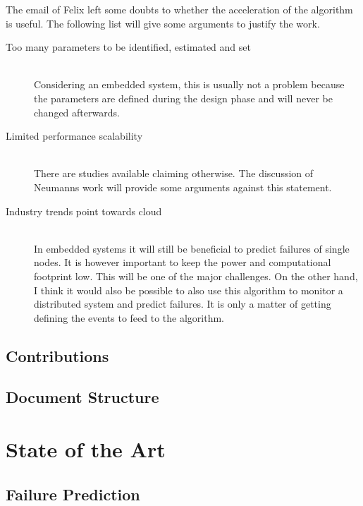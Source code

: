 \documentclass[mscthesis]{usiinfthesis}
\begin{document}
The email of Felix left some doubts to whether the acceleration of the
algorithm is useful. The following list will give some arguments to justify
the work.
\begin{description}
    \item[Too many parameters to be identified, estimated and set] \hfill \\
        Considering an embedded system, this is usually not a problem because
        the parameters are defined during the design phase and will never be
        changed afterwards.
    \item[Limited performance scalability] \hfill \\
        There are studies available claiming otherwise. The discussion of
        Neumanns work will provide some arguments against this statement.
    \item[Industry trends point towards cloud] \hfill \\
        In embedded systems it will still be beneficial to predict failures of
        single nodes. It is however important to keep the power and
        computational footprint low. This will be one of the major challenges.
        On the other hand, I think it would also be possible to also use this
        algorithm to monitor a distributed system and predict failures. It is
        only a matter of getting defining the events to feed to the algorithm.
\end{description}

\section{Contributions}
\section{Document Structure}

\chapter{State of the Art}
\section{Failure Prediction}
\end{document}
